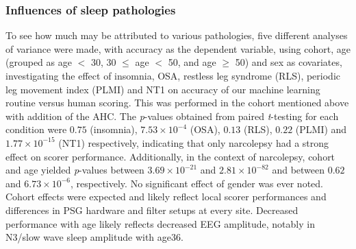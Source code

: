 \subsubsection{Influences of sleep pathologies}
To see how much may be attributed to various pathologies, five different analyses of variance were made, with accuracy as the dependent variable, using cohort, age (grouped as age $<$ 30, 30 $\leq$ age $<$ 50, and age $\geq$ 50) and sex as covariates, investigating the effect of insomnia, OSA, restless leg syndrome (RLS), periodic leg movement index (PLMI) and \ac{NT1} on accuracy of our machine learning routine versus human scoring. 
This was performed in the cohort mentioned above with addition of the \ac{AHC}. 
The \textit{p}-values obtained from paired \textit{t}-testing for each condition were $0.75$ (insomnia), $7.53 \times 10^{-4}$ (OSA), $0.13$ (RLS), $0.22$ (PLMI) and $1.77 \times 10^{-15}$ (\ac{NT1}) respectively, indicating that only narcolepsy had a strong effect on scorer performance. 
Additionally, in the context of narcolepsy, cohort and age yielded \textit{p}-values between $3.69 \times 10^{-21}$ and $2.81 \times 10^{-82}$ and between $0.62$ and $6.73 \times 10^{-6}$, respectively. 
No significant effect of gender was ever noted. 
Cohort effects were expected and likely reflect local scorer performances and differences in \ac{PSG} hardware and filter setups at every site. 
Decreased performance with age likely reflects decreased \ac{EEG} amplitude, notably in \ac{N3}/slow wave sleep amplitude with age36.

